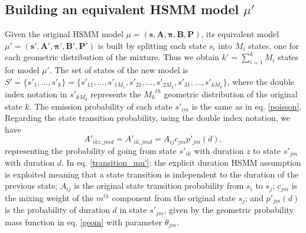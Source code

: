 \documentclass[extendedabs]{recpad2k}
\begin{document}
\subsection{Building an equivalent HSMM model $\mu'$}
\label{d1}
Given the original HSMM model $\mu=(\mathbf{s},\boldsymbol{A},\boldsymbol{\pi},\boldsymbol{B},\boldsymbol{P})$, its equivalent model $\mu'=(\mathbf{s'},\boldsymbol{A'},\boldsymbol{\pi'},\boldsymbol{B'},\boldsymbol{P'})$ is built by splitting each state $s_i$ into $M_i$ states, one for each geometric distribution %
of the mixture. Thus we obtain $k'=\sum_{i=1}^k M_i$ states for model $\mu'$. The set of states of the new model is $S'=\{s'_1,...,s'_k\}=\{s'_{11},...,s'_{1M_1},s'_{21},...,s'_{2M_2},s'_{31},...,s'_{kM_k}\}$, where the double index notation in $s'_{kM_k}$ represents the ${M_k}^{th}$ geometric distribution %
of the original state $k$. The emission probability of each state $s'_{im}$
is the same as in eq. \eqref{poisson}. %
Regarding the state transition probability, using the double index notation, we have
\begin{equation}
    A'_{ikz,jmd} = A'_{ik,jmd} = A_{ij}c_{jm}p'_{jm}(d),
    \label{transition_mu'}
\end{equation}
representing the probability of going from state $s'_{ik}$ with duration $z$ to state $s'_{jm}$ with duration $d$. In eq. \eqref{transition_mu'}: the explicit duration HSMM assumption is exploited meaning that a state transition is independent to the duration of the previous state; $A_{ij}$ is the original state transition probability from $s_i$ to $s_j$; $c_{jm}$ is the mixing weight of the $m^{th}$ component from the original state $s_j$; and $p'_{jm}(d)$ is the probability of duration $d$ in state $s'_{jm}$, given by the geometric probability mass function in eq. \eqref{geom} with parameter $\theta_{jm}$.
\end{document}
